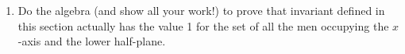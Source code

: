 \begin{enumerate}
\item Do the algebra (and show all your work!) to prove that invariant
defined in this section actually has the value 1 for the set of all the
men occupying the $x$-axis and the lower half-plane.

\end{enumerate}



